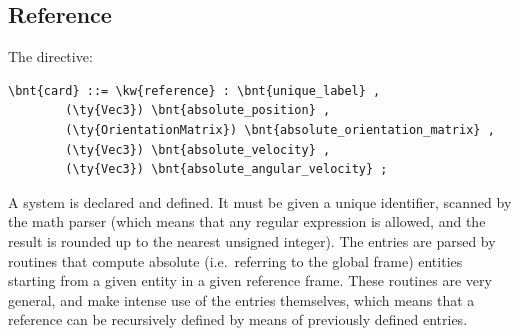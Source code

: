 \subsection{Reference}
The  directive:
\begin{Verbatim}[commandchars=\\\{\}]
    \bnt{card} ::= \kw{reference} : \bnt{unique_label} , 
        (\ty{Vec3}) \bnt{absolute_position} ,
        (\ty{OrientationMatrix}) \bnt{absolute_orientation_matrix} ,
        (\ty{Vec3}) \bnt{absolute_velocity} ,
        (\ty{Vec3}) \bnt{absolute_angular_velocity} ;
\end{Verbatim}
A  system is declared and defined.
It must be given a unique identifier, scanned by the math parser
(which means that any regular expression is allowed, and the result is
rounded up to the nearest unsigned integer).
The entries  are parsed by routines that
compute absolute (i.e.\ referring to the global frame) entities
starting from a given entity in a given reference frame.
These routines are very general, and make intense use of the 
 entries themselves, which means that a reference 
can be recursively defined by means of previously defined 
 entries.

